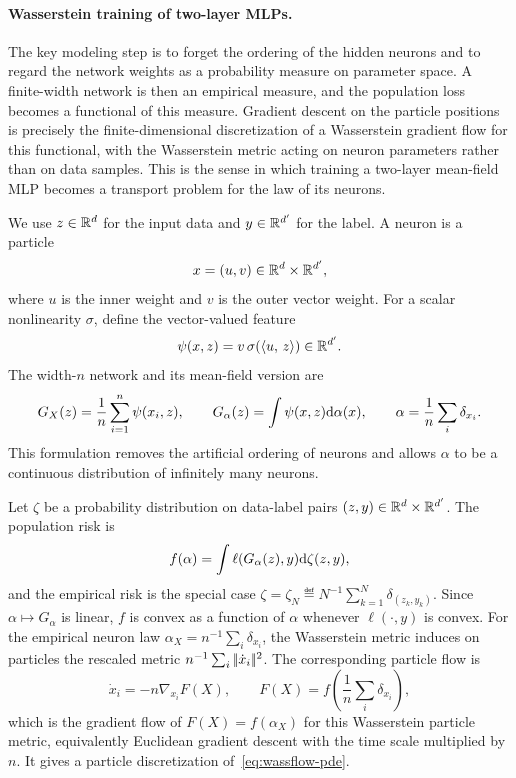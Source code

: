 \paragraph{Wasserstein training of two-layer MLPs.}
The key modeling step is to forget the ordering of the hidden neurons and to regard the network weights as a probability measure on parameter space. A finite-width network is then an empirical measure, and the population loss becomes a functional of this measure. Gradient descent on the particle positions is precisely the finite-dimensional discretization of a Wasserstein gradient flow for this functional, with the Wasserstein metric acting on neuron parameters rather than on data samples. This is the sense in which training a two-layer mean-field MLP becomes a transport problem for the law of its neurons.

We use $z\in\mathbb{R}^d$ for the input data and $y\in\mathbb{R}^{d'}$ for the label. A neuron is a particle
\[
	x=(u,v)\in\mathbb{R}^d\times\mathbb{R}^{d'},
\]
where $u$ is the inner weight and $v$ is the outer vector weight. For a scalar nonlinearity $\sigma$, define the vector-valued feature
\[
	\psi(x,z)=v\,\sigma(\langle u,\,z\rangle)\in\mathbb{R}^{d'}.
\]
The width-$n$ network and its mean-field version are
\[
	G_X(z)=\frac1n\sum_{i=1}^n\psi(x_i,z),
	\qquad
	G_\alpha(z)=\int\psi(x,z)\mathrm{d}\alpha(x),
	\qquad
	\alpha=\frac1n\sum_i\delta_{x_i}.
\]
This formulation removes the artificial ordering of neurons and allows $\alpha$ to be a continuous distribution of infinitely many neurons.

Let $\zeta$ be a probability distribution on data-label pairs $(z,y)\in\mathbb{R}^d\times\mathbb{R}^{d'}$. The population risk is
\[
	f(\alpha)=\int \ell(G_\alpha(z),y)\mathrm{d}\zeta(z,y),
\]
and the empirical risk is the special case $\zeta=\zeta_N\eqdef N^{-1}\sum_{k=1}^N\delta_{(z_k,y_k)}$. Since $\alpha\mapsto G_\alpha$ is linear, $f$ is convex as a function of $\alpha$ whenever $\ell(\cdot,y)$ is convex. For the empirical neuron law $\alpha_X=n^{-1}\sum_i\delta_{x_i}$, the Wasserstein metric induces on particles the rescaled metric $n^{-1}\sum_i|\!| \dot x_i |\!|^2$. The corresponding particle flow is
\[
	\dot x_i=-n\nabla_{x_i}F(X),
	\qquad
	F(X)=f\!\left(\frac1n\sum_i\delta_{x_i}\right),
\]
which is the gradient flow of $F(X)=f(\alpha_X)$ for this Wasserstein particle metric, equivalently Euclidean gradient descent with the time scale multiplied by $n$. It gives a particle discretization of~\eqref{eq:wassflow-pde}.

